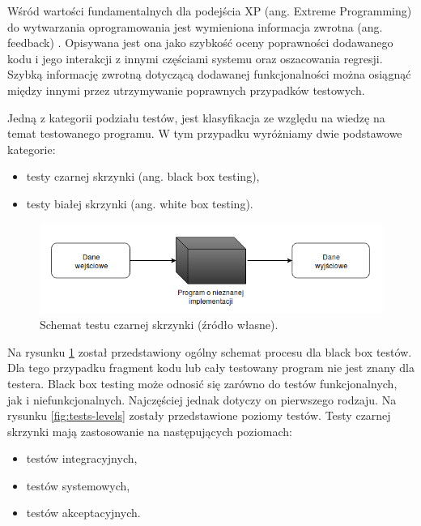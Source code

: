 Wśród wartości fundamentalnych dla podejścia XP (ang. Extreme Programming) do wytwarzania oprogramowania jest wymieniona informacja zwrotna (ang. feedback) \cite{extreem-programming}.
Opisywana jest ona jako szybkość oceny poprawności dodawanego kodu i jego interakcji z innymi częściami systemu oraz oszacowania regresji.
Szybką informację zwrotną dotyczącą dodawanej funkcjonalności można osiągnąć między innymi przez utrzymywanie poprawnych przypadków testowych.

Jedną z kategorii podziału testów, jest klasyfikacja ze względu na wiedzę na temat testowanego programu.
W tym przypadku wyróżniamy dwie podstawowe kategorie:
\begin{itemize}
\item testy czarnej skrzynki (ang. black box testing),
\item testy białej skrzynki (ang. white box testing).
\end{itemize}

\begin{figure}[h]
    \centering
    \includegraphics[width = 13cm]{chapter02/black-box.png}
    \caption{Schemat testu czarnej skrzynki (źródło własne).}
    \label{fig:black-box}
\end{figure}

Na rysunku \ref{fig:black-box} został przedstawiony ogólny schemat procesu dla black box testów.
Dla tego przypadku fragment kodu lub cały testowany program nie jest znany dla testera.
Black box testing może odnosić się zarówno do testów funkcjonalnych, jak i niefunkcjonalnych.
Najczęściej jednak dotyczy on pierwszego rodzaju.
Na rysunku \ref{fig:tests-levels} zostały przedstawione poziomy testów.
Testy czarnej skrzynki mają zastosowanie na następujących poziomach:
\begin{itemize}
\item testów integracyjnych,
\item testów systemowych,
\item testów akceptacyjnych.
\end{itemize}


